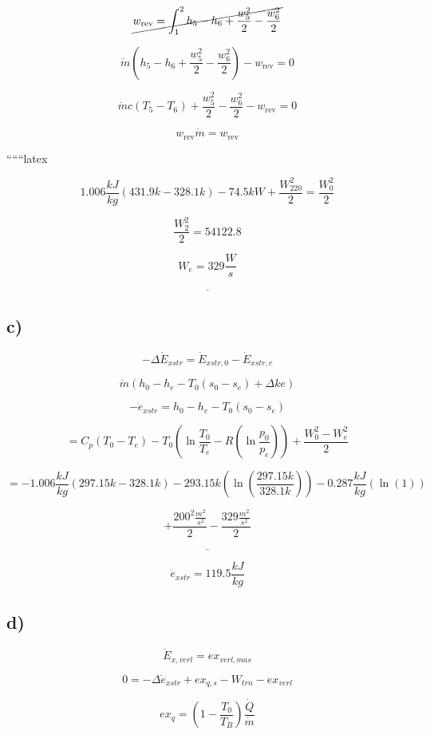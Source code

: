 \[
\cancel{w_{\text{rev}} = \int_{1}^{2} h_{5} - h_{6} + \frac{w_{5}^{2}}{2} - \frac{w_{6}^{2}}{2}}
\]

\[
\dot{m} (h_{5} - h_{6} + \frac{w_{5}^{2}}{2} - \frac{w_{6}^{2}}{2}) - w_{\text{rev}} = 0
\]

\[
\dot{m} c (T_{5} - T_{6}) + \frac{w_{5}^{2}}{2} - \frac{w_{6}^{2}}{2} - w_{\text{rev}} = 0
\]

\[
w_{\text{rev}} \dot{m} = w_{\text{rev}}
\]

``````latex

\[
1.006 \frac{kJ}{kg} \left( 431.9k - 328.1k \right) - 74.5kW + \frac{W_{220}^2}{2} = \frac{W_0^2}{2}
\]

\[
\frac{W_2^2}{2} = 54122.8
\]

\[
W_e = 329 \frac{W}{s}
\]

\[
\underline{\hspace{5cm}}
\]

\subsection*{c)}

\[
-\Delta \dot{E}_{xstr} = \dot{E}_{xstr,0} - \dot{E}_{xstr,e}
\]

\[
\dot{m} (h_0 - h_e - T_0 (s_0 - s_e) + \Delta ke)
\]

\[
-\dot{e}_{xstr} = h_0 - h_e - T_0 (s_0 - s_e)
\]

\[
= C_p (T_0 - T_e) - T_0 \left( \ln \frac{T_0}{T_e} - R \left( \ln \frac{p_0}{p_e} \right) \right) + \frac{W_0^2 - W_e^2}{2}
\]

\[
= -1.006 \frac{kJ}{kg} \left( 297.15k - 328.1k \right) - 293.15k \left( \ln \left( \frac{297.15k}{328.1k} \right) \right) - 0.287 \frac{kJ}{kg} \left( \ln (1) \right)
\]

\[
+ \frac{200^2 \frac{m^2}{s^2}}{2} - \frac{329 \frac{m^2}{s^2}}{2}
\]

\[
\underline{\hspace{5cm}}
\]

\[
\dot{e}_{xstr} = 119.5 \frac{kJ}{kg}
\]

\subsection*{d)}

\[
\dot{E}_{x,verl} = ex_{verl,mas}
\]

\[
0 = -\Delta \dot{e}_{xstr} + ex_{q,s} - W_{trn} - ex_{verl}
\]

\[
ex_{q} = \left( 1 - \frac{T_0}{T_B} \right) \frac{\dot{Q}}{\dot{m}}
\]

